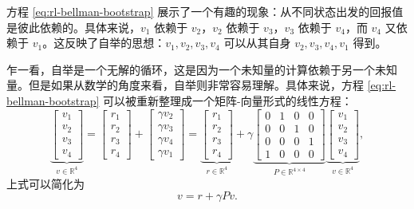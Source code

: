 方程 \cref{eq:rl-bellman-bootstrap} 展示了一个有趣的现象：从不同状态出发的回报值是彼此依赖的。具体来说，$v_1$ 依赖于 $v_2$，$v_2$ 依赖于 $v_3$，$v_3$ 依赖于 $v_4$，而 $v_4$ 又依赖于 $v_1$。这反映了自举的思想：$v_1,v_2,v_3,v_4$ 可以从其自身 $v_2,v_3,v_4,v_1$ 得到。

乍一看，自举是一个无解的循环，这是因为一个未知量的计算依赖于另一个未知量。但是如果从数学的角度来看，自举则非常容易理解。具体来说，方程 \cref{eq:rl-bellman-bootstrap} 可以被重新整理成一个矩阵-向量形式的线性方程：
\begin{equation}
\underbrace{\begin{bmatrix} v_1 \\ v_2 \\ v_3 \\ v_4 \end{bmatrix}}_{v \in \mathbb{R}^4}
= \begin{bmatrix} r_1 \\ r_2 \\ r_3 \\ r_4 \end{bmatrix}
+ \begin{bmatrix} \gamma v_2 \\ \gamma v_3 \\ \gamma v_4 \\ \gamma v_1 \end{bmatrix}
= \underbrace{\begin{bmatrix} r_1 \\ r_2 \\ r_3 \\ r_4 \end{bmatrix}}_{r \in \mathbb{R}^4}
+ \gamma \underbrace{\begin{bmatrix}
0 & 1 & 0 & 0 \\
0 & 0 & 1 & 0 \\
0 & 0 & 0 & 1 \\
1 & 0 & 0 & 0
\end{bmatrix}}_{P \in \mathbb{R}^{4 \times 4}}
\underbrace{\begin{bmatrix} v_1 \\ v_2 \\ v_3 \\ v_4 \end{bmatrix}}_{v \in \mathbb{R}^4},
\label{eq:rl-bellman-toy-matrix}
\end{equation}
上式可以简化为
\begin{equation*}
v = r + \gamma P v.
\end{equation*}

